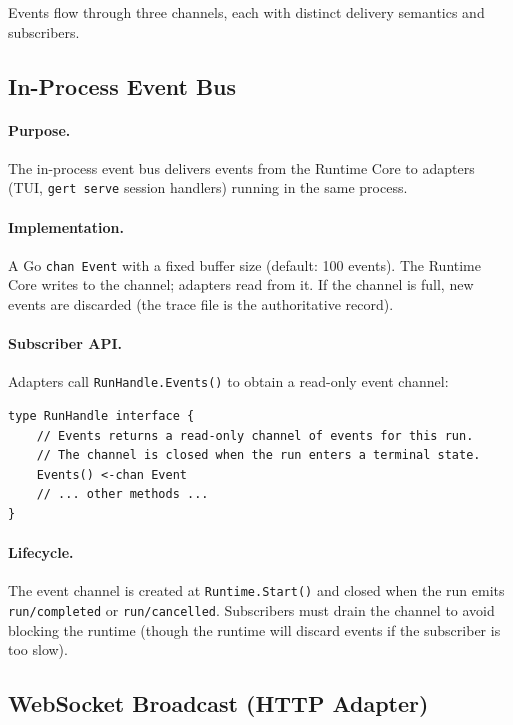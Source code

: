 Events flow through three channels, each with distinct delivery semantics and subscribers.

\subsection{In-Process Event Bus}

\paragraph{Purpose.} The in-process event bus delivers events from the Runtime Core to adapters (TUI, \texttt{gert serve} session handlers) running in the same process.

\paragraph{Implementation.} A Go \texttt{chan Event} with a fixed buffer size (default: 100 events). The Runtime Core writes to the channel; adapters read from it. If the channel is full, new events are discarded (the trace file is the authoritative record).

\paragraph{Subscriber API.} Adapters call \texttt{RunHandle.Events()} to obtain a read-only event channel:

\begin{verbatim}
type RunHandle interface {
    // Events returns a read-only channel of events for this run.
    // The channel is closed when the run enters a terminal state.
    Events() <-chan Event
    // ... other methods ...
}
\end{verbatim}

\paragraph{Lifecycle.} The event channel is created at \texttt{Runtime.Start()} and closed when the run emits \texttt{run/completed} or \texttt{run/cancelled}. Subscribers must drain the channel to avoid blocking the runtime (though the runtime will discard events if the subscriber is too slow).


\subsection{WebSocket Broadcast (HTTP Adapter)}

